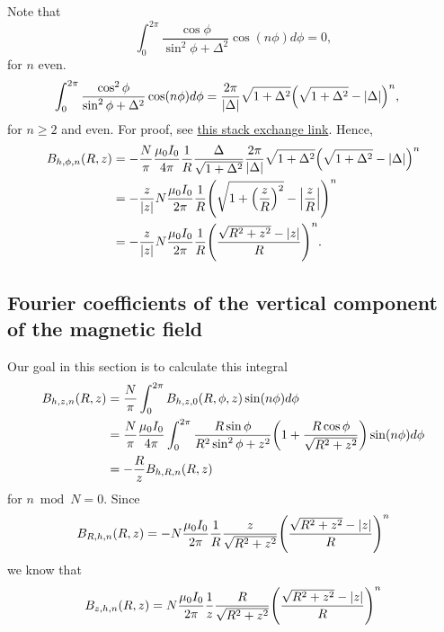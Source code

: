 \documentclass{article}
\begin{document}
Note that
\[\int_0^{2\pi} \frac{\cos\phi}{\sin^2\phi+\Delta^2}\cos(n\phi)d\phi = 0,\]
for $n$ even.
\[\begin{aligned}
\int_0^{2\pi} \frac{\cos^2\phi}{\sin^2\phi+\Delta^2}\cos(n\phi)d\phi &= \frac{2\pi}{|\Delta|}\sqrt{1 + \Delta^2}\qty(\sqrt{1+\Delta^2}-\abs{\Delta})^n,
\end{aligned}\]
for $n\ge 2$ and even. For proof, see \href{https://math.stackexchange.com/questions/5027889/how-to-express-int-pi-pi-frac-cos2x-cosnx-sin2xa2dx-as-a#5027947}{this stack exchange link}.
Hence,
\[\begin{aligned}
    B_{h, \phi, n}(R, z)&=-\frac{N}{\pi}\frac{\mu_0 I_0}{4 \pi}\frac{1}{R} \frac{\Delta}{\sqrt{1+\Delta^2}} \frac{2\pi}{|\Delta|}\sqrt{1 + \Delta^2}\qty(\sqrt{1+\Delta^2}-\abs{\Delta})^n \\
    &= -\frac{z}{\abs{z}}N\frac{\mu_0 I_0}{2 \pi}\frac{1}{R}\qty(\sqrt{1+\qty(\frac{z}{R})^2}-\abs{\frac{z}{R}})^n \\
    &= -\frac{z}{\abs{z}}N\frac{\mu_0 I_0}{2 \pi}\frac{1}{R}\qty(\frac{\sqrt{R^2+z^2}-\abs{z}}{R})^n.
\end{aligned}
\]


\subsection{Fourier coefficients of the vertical component of the magnetic field}

Our goal in this section is to calculate this integral
\[\begin{aligned}
B_{h, z, n}(R, z)&= \frac{N}{\pi}\int_0^{2\pi} B_{h, z, 0}(R, \phi, z)\sin(n\phi)d\phi \\
&=\frac{N}{\pi}\frac{\mu_0 I_0}{4 \pi}\int_0^{2\pi} \frac{R\sin\phi}{R^2\sin^2\phi+z^2}\qty(1+\frac{R\cos\phi}{\sqrt{R^2+z^2}})\sin(n\phi)d\phi \\
&= -\frac{R}{z}B_{h, R, n}(R, z)
\end{aligned}\]
for $n \bmod N = 0$.
Since
\[\begin{aligned}
B_{R, h, n}(R, z) &= -N\frac{\mu_0 I_0}{2 \pi}\frac{1}{R}\frac{z}{\sqrt{R^2+z^2}}\qty(\frac{\sqrt{R^2+z^2}-\abs{z}}{R})^n \\
\end{aligned}\]
we know that
\[\begin{aligned}
B_{z, h, n}(R, z) &= N\frac{\mu_0 I_0}{2 \pi}\frac{1}{z}\frac{R}{\sqrt{R^2+z^2}}\qty(\frac{\sqrt{R^2+z^2}-\abs{z}}{R})^n \\
\end{aligned}\]
\end{document}
